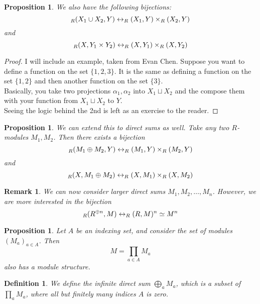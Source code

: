 \documentclass{article}
\theoremstyle{norm}
\newtheorem{df}[thm]{Definition}
\newtheorem{rem}[thm]{Remark}
\newtheorem{prop}[thm]{Proposition}
\let\hom\relax
\DeclareMathOperator{\hom}{Hom}
\begin{document}
\begin{prop}
We also have the following bijections:
\[ \hom_R(X_1 \cup X_2, Y) \leftrightarrow \hom_R(X_1, Y) \times
\hom_R(X_2, Y) \]
and
\[ \hom_R(X, Y_1 \times Y_2) \leftrightarrow \hom_R(X, Y_1) \times
\hom_R(X, Y_2) \]
\end{prop}
\begin{proof}
I will include an example, taken from Evan Chen. Suppose you want to
define a function on the set $\lbrace 1, 2, 3 \rbrace$. It is the same
as defining a function on the set $\lbrace 1, 2 \rbrace$ and then
another function on the set $\lbrace 3 \rbrace$. \\
Basically, you take two projections $\alpha_1, \alpha_2$ into $X_1
\sqcup X_2$ and the compose them with your function from $X_1 \sqcup
X_2$ to $Y$. \\
Seeing the logic behind the 2nd is left as an exercise to the reader.
\end{proof}

\begin{prop}
We can extend this to direct sums as well. Take any two $R$-modules
$M_1, M_2$. Then there exists a bijection
\[ \hom_R(M_1 \oplus M_2, Y) \leftrightarrow \hom_R(M_1, Y) \times
\hom_R(M_2, Y) \]
and
\[ \hom_R(X, M_1 \oplus M_2) \leftrightarrow \hom_R(X, M_1) \times
\hom_R(X, M_2) \]
\end{prop}

\begin{rem}
We can now consider larger direct sums $M_1, M_2, \dots, M_n$. However,
we are more interested in the bijection
\[ \hom_R(R^{\oplus n}, M) \leftrightarrow \hom_R(R, M)^n \simeq M^n \]
\end{rem}

\begin{prop}
Let $A$ be an indexing set, and consider the set of modules $(M_a)_{a
\in A}$. Then
\[ M = \prod_{a \in A} M_a \]
also has a module structure.
\end{prop}

\begin{df}
We define the infinite direct sum $\bigoplus_a M_a$, which is a subset
of $\prod_a M_a$, where all but finitely many indices $A$ is zero.
\end{df}



\end{document}
